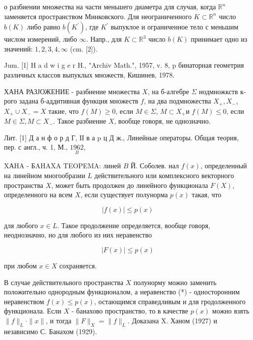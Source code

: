 \documentclass[10pt]{article}
\begin{document}
о разбиении множества на части меньшего диаметра для случая, когда $\mathbb{R}^{n}$ заменяется пространством Минковского. Для неограниченного $K \subset \mathbb{R}^{n}$ число $b(K)$ либо равно $b\left(K^{\prime}\right)$, где $K^{\prime}$ выпуклое и ограниченное тело с меньшим числом измерений, либо $\infty$. Напр., для $K \subset \mathbb{R}^{3}$ число $b(K)$ принимает одно из значений: $1,2,3,4, \infty$ (cm. [2]).



Jum. [1] H a d w i g e r H., "Archiv Math.", 1957, v. 8, p бинаторная геометрия различных классов выпуклых множеств, Кишинев, 1978.



ХАНА РАЗЈОЖЕНИЕ - разбиение множества $X$, на б-алгебре $\Sigma$ нодмножкств к-рого задана б-аддитивная функция множеств $f$, на два подмножества $X_{+}, X{ }_{-}$, $X_{+} \cup X_{-}=X$ такие, что $f(M) \geqslant 0$, если $M \in \Sigma$, $M \subset X_{+}$и $f(M) \leqslant 0$, если $M \in \Sigma, M \subset X_{-}$. Такое разбиение $X$, вообще говоря, не однозначно.



Лит. [1] Д а н ф о р д Г, ІІ в а $\mathrm{p}$ ц Д ж., Линейные операторы. Общая теория, пер. с англ., ч. 1, М., $\underset{B}{1962}$,



XАHA - БAHAXA TEOPEMA: линей $B$ Й. Соболев. нал $f(x)$, определенный на линейном многообразии $L$ действительного или комплексного векторного пространства $X$, может быть продолжен до линейного функционала $F(X)$, определенного на всем $X$, если существует полунорма $p(x)$ такая, что



\[

|f(x)| \leqslant p(x)

\]



для любого $x \in L$. Такое продолжение определяется, вообще говоря, неоднозначно, но для любого из них неравенство



\[

|F(x)| \leqslant p(x)

\]



при любом $x \in X$ сохраняется.



В случае действительного пространства $X$ полунорму можно заменить положительно однородным функционалом, а неравенство (*) - односторонним неравенством $f(x) \leqslant p(x)$, остающимся справедливым и для гродолженного функционала. Если $X$ - банахово пространство, то в качестве $p(x)$ можно взять $\|f\|_{L} \cdot\|x\|$, и тогда $\|F\|_{X}=\|f\|_{L}$. Доказана $\mathrm{X}$. Ханом (1927) и независимо С. Банахом (1929).
\end{document}
